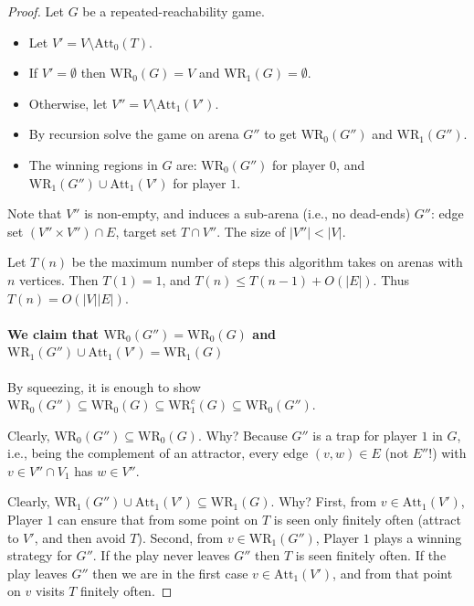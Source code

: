 \documentclass[a4paper,10pt]{article}
\newcommand{\po}{Player $1$\xspace}
\newcommand{\WR}{\textrm{WR}}
\newcommand{\att}{\textrm{Att}}
\begin{document}
\begin{proof}
	Let $G$ be a repeated-reachability game. 
	
	\begin{itemize}  
	 \item Let $V' = V \setminus \att_0(T)$. 
	 \item If $V' = \emptyset$ then $\WR_0(G) = V$ and $\WR_1(G) = \emptyset$.
	 \item Otherwise, let $V'' = V \setminus \att_1(V')$. 
	\item By recursion solve the game on arena $G''$ to get $\WR_0(G'')$ and $\WR_1(G'')$.
	\item The winning regions in $G$ are: $\WR_0(G'')$ for player $0$, and $\WR_1(G'') \cup \att_1(V')$ for player $1$.
	\end{itemize}
	
	Note that $V''$ is non-empty, and induces a sub-arena (i.e., no dead-ends) $G''$: edge set $(V'' \times V'') \cap E$, 
	target set $T \cap V''$.	The size of $|V''| < |V|$. 
	
		Let $T(n)$ be the maximum number of steps this algorithm takes on arenas with $n$ vertices.
	Then $T(1) = 1$, and $T(n) \leq T(n-1) + O(|E|)$. Thus $T(n) = O(|V| |E|)$.

	
	\paragraph{We claim that $\WR_0(G'') = \WR_0(G)$ and $\WR_1(G'') \cup \att_1(V') = \WR_1(G)$} By squeezing, it is enough to show $\WR_0(G'') \subseteq \WR_0(G) \subseteq \WR_1^c(G) \subseteq \WR_0(G'')$.
	
	Clearly, $\WR_0(G'') \subseteq \WR_0(G)$. Why? Because $G''$ is a trap for player $1$ in $G$, i.e., being the complement of an attractor, 
	every edge $(v,w) \in E$ (not $E''$!) with $v \in V'' \cap V_1$ has $w \in V''$.
	
	Clearly, $\WR_1(G'') \cup \att_1(V') \subseteq \WR_1(G)$. Why? First, from $v \in \att_1(V')$, \po can ensure that from some point on $T$ 
	is seen only finitely often (attract to $V'$, and then avoid $T$). Second, from $v \in \WR_1(G'')$, \po plays a winning strategy for $G''$. 
	If the play never leaves $G''$ then $T$ is seen finitely often. If the play leaves $G''$ then we are in the first case $v \in \att_1(V')$, 
	and from that point on $v$ visits $T$ finitely often.		
	
\end{proof}
\end{document}
